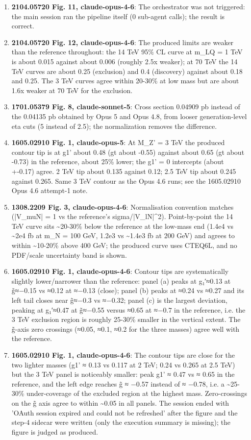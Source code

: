\begin{enumerate}
\item \textbf{2104.05720 Fig. 11, claude-opus-4-6}: The orchestrator was not triggered: the main session ran the pipeline itself (0 sub-agent calls); the result is correct.
\item \textbf{2104.05720 Fig. 12, claude-opus-4-6}: The produced limits are weaker than the reference throughout: the 14 TeV 95\% CL curve at m\_LQ = 1 TeV is about 0.015 against about 0.006 (roughly 2.5x weaker); at 70 TeV the 14 TeV curves are about 0.25 (exclusion) and 0.4 (discovery) against about 0.18 and 0.25. The 3 TeV curves agree within 20-30\% at low mass but are about 1.6x weaker at 70 TeV for the exclusion.
\item \textbf{1701.05379 Fig. 8, claude-sonnet-5}: Cross section 0.04909 pb instead of the 0.04135 pb obtained by Opus 5 and Opus 4.8, from looser generation-level eta cuts (5 instead of 2.5); the normalization removes the difference.
\item \textbf{1605.02910 Fig. 1, claude-opus-5}: At M\_Z' = 3 TeV the produced contour tip is at g1' about 0.48 (gt about -0.55) against about 0.65 (gt about -0.73) in the reference, about 25\% lower; the g1' = 0 intercepts (about +-0.17) agree. 2 TeV tip about 0.135 against 0.12; 2.5 TeV tip about 0.245 against 0.265. Same 3 TeV contour as the Opus 4.6 runs; see the 1605.02910 Opus 4.6 attempt-1 note.
\item \textbf{1308.2209 Fig. 3, claude-opus-4-6}: Normalisation convention matches (|V\_muN| = 1 vs the reference's sigma/|V\_lN|\textasciicircum{}2). Point-by-point the 14 TeV curve sits \textasciitilde{}20-30\% below the reference at the low-mass end (1.4e4 vs \textasciitilde{}2e4 fb at m\_N = 100 GeV, 1.2e3 vs \textasciitilde{}1.4e3 fb at 200 GeV) and agrees to within \textasciitilde{}10-20\% above 400 GeV; the produced curve uses CTEQ6L, and no PDF/scale uncertainty band is shown.
\item \textbf{1605.02910 Fig. 1, claude-opus-4-6}: Contour tips are systematically slightly lower/narrower than the reference: panel (a) peaks at g₁′≈0.13 at g̃≈−0.15 vs ≈0.12 at ≈−0.13 (close); panel (b) peaks at ≈0.24 vs ≈0.27 and its left tail closes near g̃≈−0.3 vs ≈−0.32; panel (c) is the largest deviation, peaking at g₁′≈0.47 at g̃≈−0.55 versus ≈0.65 at ≈−0.7 in the reference, i.e. the 3 TeV exclusion region is roughly 25-30\% smaller in the vertical extent. The g̃-axis zero crossings (≈0.05, ≈0.1, ≈0.2 for the three masses) agree well with the reference.
\item \textbf{1605.02910 Fig. 1, claude-opus-4-6}: The contour tips are close for the two lighter masses (g1' ≈ 0.13 vs 0.117 at 2 TeV; 0.24 vs 0.265 at 2.5 TeV) but the 3 TeV panel is noticeably smaller: peak g1' ≈ 0.47 vs ≈ 0.65 in the reference, and the left edge reaches g̃ ≈ −0.57 instead of ≈ −0.78, i.e. a \textasciitilde{}25-30\% under-coverage of the excluded region at the highest mass. Zero-crossings on the g̃ axis agree to within \textasciitilde{}0.05 in all panels. The session ended with 'OAuth session expired and could not be refreshed' after the figure and the step-4 sidecar were written (only the execution summary is missing); the figure is judged as produced.

\end{enumerate}
